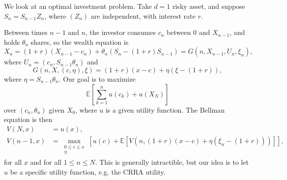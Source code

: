 \documentclass[12pt]{article}
\begin{document}
\begin{exbox}
	We look at an optimal investment problem. Take $d = 1$ risky asset, and suppose $S_n = S_{n-1} Z_n$, where $(Z_n)$ are independent, with interest rate $r$.

	Between times $n-1$ and $n$, the investor consumes $c_n$ between $0$ and $X_{n-1}$, and holds $\theta_n$ shares, so the wealth equation is
	\[
	X_n = (1 + r)(X_{n-1} - c_n) + \theta_n(S_n - (1 + r)S_{n-1}) = G(n, X_{n-1}, U_n, \xi_n),
	\]
	where $U_n = (c_n, S_{n-1} \theta_n)$ and
	\[
	G(n, X, (c, \eta), \xi) = (1 + r)(x - c) + \eta(\xi - (1 + r)),
	\]
	where $\eta = S_{n-1} \theta_n$. Our goal is to maximize
	\[
	\mathbb{E}\left[ \sum_{k = 1}^n u(c_k) + u(X_N) \right]
	\]
	over $(c_n, \theta_n)$ given $X_0$, where $u$ is a given utility function. The Bellman equation is then
	\begin{align*}
		V(N, x) &= u(x), \\
		V(n-1, x) &= \max_{\substack{0 \leq c \leq x \\ \eta}} \left[ u(c) + \mathbb{E}\left[ V(n, (1+r)(x - c) + \eta(\xi_n - (1+r))) \right] \right],
	\end{align*}
	for all $x$ and for all $1 \leq n \leq N$. This is generally intractible, but our idea is to let $u$ be a specific utility function, e.g. the CRRA utility.


\end{exbox}
\end{document}
